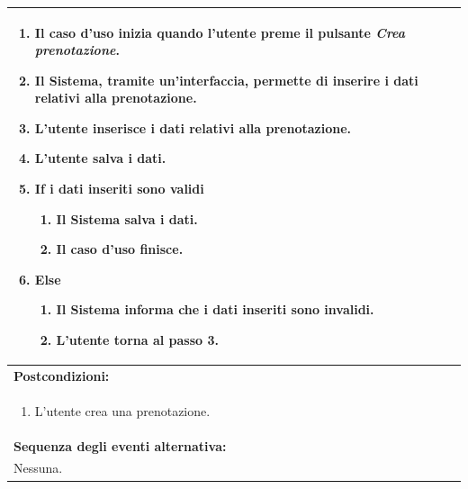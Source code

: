 \documentclass{article}
\begin{document}
\begin{table}[H]
\begin{tabular}{|p{\linewidth}|}
\begin{enumerate}
                            \item Il caso d'uso inizia quando l'utente preme il pulsante \emph{Crea prenotazione}.
                            \item Il Sistema, tramite un'interfaccia, permette di inserire i dati relativi alla prenotazione.
                            \item L'utente inserisce i dati relativi alla prenotazione.
                            \item L'utente salva i dati.
                            \item \textbf{If} i dati inseriti sono validi
                            \begin{enumerate}
                                \item Il Sistema salva i dati.
                                \item Il caso d'uso finisce.
                            \end{enumerate}
                            \item \textbf{Else}
                            \begin{enumerate}
                                \item Il Sistema informa che i dati inseriti sono invalidi.
                                \item L'utente torna al passo 3.
                            \end{enumerate}
                        \end{enumerate} \\
                        \hline
                        \cellcolor{gray!20}
                        \textbf{Postcondizioni:} \\
                        \cellcolor{gray!20}
                        \begin{minipage}{\linewidth}
                            \begin{enumerate}
                                \item L'utente crea una prenotazione.
                            \end{enumerate}
                        \end{minipage}
                        \vspace{-10pt} \\
                        \hline
                        \textbf{Sequenza degli eventi alternativa:} \\
                        Nessuna. \\
                        \hline
                    \end{tabular}
                \end{table}
\end{document}
